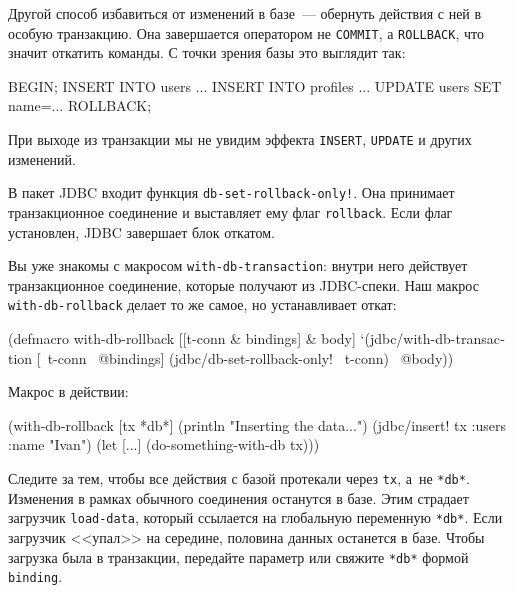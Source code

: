 
Другой способ избавиться от изменений в базе~--- обернуть действия с ней в
особую транзакцию. Она завершается оператором не \verb|COMMIT|, а
\verb|ROLLBACK|, что значит откатить команды. С точки зрения базы это
выглядит так:

\begin{english}
  \begin{sql}
BEGIN;
INSERT INTO users ...
INSERT INTO profiles ...
UPDATE users SET name=...
ROLLBACK;
  \end{sql}
\end{english}

При выходе из транзакции мы не увидим эффекта \verb|INSERT|, \verb|UPDATE| и
других изменений.

В пакет JDBC входит функция \verb|db-set-rollback-only!|. Она принимает
транзакционное соединение и выставляет ему флаг \verb|rollback|. Если флаг
установлен, JDBC завершает блок откатом.


Вы уже знакомы с макросом \verb|with-db-transaction|: внутри него действует
транзакционное соединение, которые получают из JDBC-спеки. Наш макрос
\verb|with-db-rollback| делает то же самое, но устанавливает откат:

\begin{english}
  \begin{clojure}
(defmacro with-db-rollback
  [[t-conn & bindings] & body]
  `(jdbc/with-db-transaction [~t-conn ~@bindings]
     (jdbc/db-set-rollback-only! ~t-conn)
     ~@body))
  \end{clojure}
\end{english}

\noindent
Макрос в действии:

\begin{english}
  \begin{clojure}
(with-db-rollback [tx *db*]
  (println "Inserting the data...")
  (jdbc/insert! tx :users {:name "Ivan"})
  (let [...]
    (do-something-with-db tx)))
  \end{clojure}
\end{english}

Следите за тем, чтобы все действия с базой протекали через \verb|tx|, а~не
\verb|*db*|. Изменения в рамках обычного соединения останутся в базе. Этим
страдает загрузчик \verb|load-data|, который ссылается на глобальную переменную
\verb|*db*|. Если загрузчик <<упал>> на середине, половина данных останется в
базе. Чтобы загрузка была в транзакции, передайте параметр или свяжите
\verb|*db*| формой \verb|binding|.

